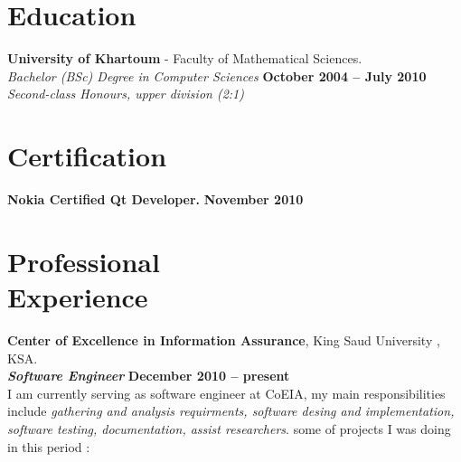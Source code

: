 \documentclass[margin,line,a4paper]{resume}
\begin{document}
\begin{resume}
    \section{\mysidestyle Education}

    \textbf{University of Khartoum} - Faculty of Mathematical Sciences. \vspace{2mm}\\\vspace{1mm}%
    \textsl{Bachelor (BSc) Degree in Computer Sciences} \hfill \textbf{ October 2004 -- July 2010} \\%
    \textsl{Second-class Honours, upper division (2:1)}\vspace{-3mm}\\\vspace{-1mm}%

    \section{\mysidestyle Certification}

    \textbf{Nokia Certified Qt Developer.} \hfill \textbf{November 2010} \vspace{-3mm}\\\vspace{-1mm}%

    \section{\mysidestyle Professional\\Experience}

    \textbf{Center of Excellence in Information Assurance}, King Saud University , KSA. \vspace{2mm}\\\vspace{1mm}%
    \textsl{\textbf{Software Engineer}} \hfill \textbf{December 2010 -- present}\\
     I am currently serving as software engineer at CoEIA, my main responsibilities include \textsl{gathering and analysis requirments, software desing and implementation, software testing, documentation, assist researchers}. some of projects I was doing in this period :


\end{resume}
\end{document}
